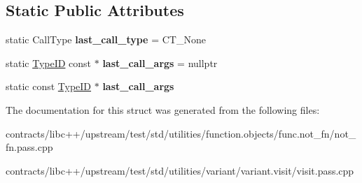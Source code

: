 \subsection*{Static Public Attributes}
\begin{DoxyCompactItemize}
\item 
\mbox{\label{struct_forwarding_call_object_a044204aab704d73ee5fa1c2810b49531}} 
static Call\+Type {\bfseries last\+\_\+call\+\_\+type} = C\+T\+\_\+\+None
\item 
\mbox{\label{struct_forwarding_call_object_aeb896b72ae8d495ecced4830725c059f}} 
static \mbox{\hyperlink{struct_type_i_d}{Type\+ID}} const  $\ast$ {\bfseries last\+\_\+call\+\_\+args} = nullptr
\item 
\mbox{\label{struct_forwarding_call_object_acee2119932a35f233576591c12573969}} 
static const \mbox{\hyperlink{struct_type_i_d}{Type\+ID}} $\ast$ {\bfseries last\+\_\+call\+\_\+args}
\end{DoxyCompactItemize}


The documentation for this struct was generated from the following files\+:\begin{DoxyCompactItemize}
\item 
contracts/libc++/upstream/test/std/utilities/function.\+objects/func.\+not\+\_\+fn/not\+\_\+fn.\+pass.\+cpp\item 
contracts/libc++/upstream/test/std/utilities/variant/variant.\+visit/visit.\+pass.\+cpp\end{DoxyCompactItemize}
